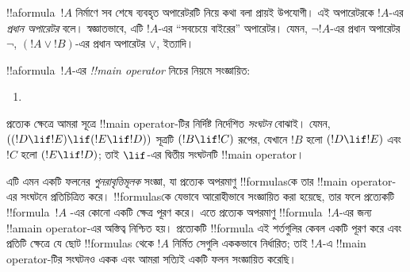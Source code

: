 \documentclass[../../../include/open-logic-section]{subfiles}
\begin{document}


\begin{explain}
!!a{formula}~$!A$ নির্মাণে সব শেষে ব্যবহৃত অপারেটরটি নিয়ে কথা বলা
প্রায়ই উপযোগী। এই অপারেটরকে $!A$-এর \emph{প্রধান অপারেটর} বলে।
স্বজ্ঞাতভাবে, এটি $!A$-এর “সবচেয়ে বাইরের” অপারেটর। যেমন,
$\lnot !A$-এর প্রধান অপারেটর $\lnot$, $(!A \lor !B)$-এর প্রধান
অপারেটর $\lor$, ইত্যাদি।
\end{explain}


\begin{defn}
!!a{formula}~$!A$-এর \emph{!!{main operator}} নিচের নিয়মে সংজ্ঞায়িত:
\begin{enumerate}
\item {}







\end{enumerate}
\end{defn}

প্রত্যেক ক্ষেত্রে আমরা সূত্রে !!{main operator}-টির নির্দিষ্ট নির্দেশিত
\emph{সংঘটন} বোঝাই। যেমন, $((!D \lif !E) \lif (!E \lif !D))$ সূত্রটি
$(!B \lif !C)$ রূপের, যেখানে $!B$ হলো $(!D \lif !E)$ এবং $!C$ হলো
$(!E \lif !D)$; তাই $\lif$-এর দ্বিতীয় সংঘটনটি !!{main operator}।

\begin{explain}
এটি এমন একটি ফলনের \emph{পুনরাবৃত্তিমূলক} সংজ্ঞা, যা প্রত্যেক
অপরমাণু !!{formula}sকে তার !!{main operator}-এর সংঘটনে প্রতিচিত্রিত
করে। !!{formula}sকে যেভাবে আরোহীভাবে সংজ্ঞায়িত করা হয়েছে, তার ফলে
প্রত্যেকটি !!{formula}~$!A$ -এর কোনো একটি ক্ষেত্র
পূরণ করে। এতে প্রত্যেক অপরমাণু !!{formula}~$!A$-এর জন্য !!a{main operator}-এর অস্তিত্ব নিশ্চিত হয়। প্রত্যেকটি !!{formula} এই
শর্তগুলির কেবল একটি পূরণ করে এবং প্রতিটি ক্ষেত্রে যে ছোট
!!{formula}s থেকে $!A$ নির্মিত সেগুলি এককভাবে নির্ধারিত; তাই $!A$-এ
!!{main operator}-টির সংঘটনও একক এবং আমরা সত্যিই একটি ফলন সংজ্ঞায়িত
করেছি।
\end{explain}
\end{document}
